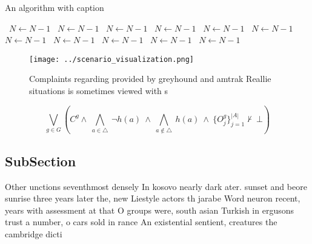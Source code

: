 \documentclass[a4paper]{article}
\begin{document}
\begin{algorithm}
\caption{An algorithm with caption}
\begin{algorithmic}
\    \State $N \gets N - 1$
\    \State $N \gets N - 1$
\    \State $N \gets N - 1$
\    \State $N \gets N - 1$
\    \State $N \gets N - 1$
\    \State $N \gets N - 1$
\    \State $N \gets N - 1$
\    \State $N \gets N - 1$
\    \State $N \gets N - 1$
\    \State $N \gets N - 1$
\    \State $N \gets N - 1$
\EndWhile
\end{algorithmic}
\end{algorithm}

\begin{figure}
\centering
\texttt{[image: ../scenario\_visualization.png]}
\caption{Complaints regarding provided by greyhound and amtrak Reallie situations is sometimes viewed with s
}
\end{figure}
 
\[\bigvee_{g\in G} (C^g \wedge\ \bigwedge_{a\in \triangle}\ \neg h(a)\ \wedge\ \bigwedge_{a\notin \triangle}\ h(a)\ \wedge\ \{O_j^g\}_{j=1}^{|A|} \nvdash\ \bot )\]

\subsection{SubSection}

Other unctions seventhmost densely In kosovo nearly dark ater. sunset and beore sunrise three years later the, new Liestyle actors th jarabe Word neuron recent, years with assessment at that O groups were, south asian Turkish in ergusons trust a number, o cars sold in rance An existential sentient, creatures the cambridge dicti
\end{document}
